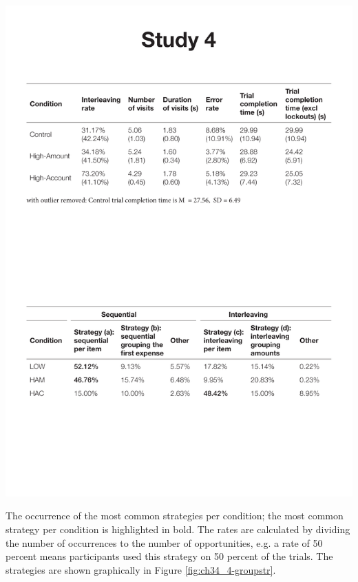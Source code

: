 \begin{table}[!ht]
  \centering
    \includegraphics[width=\textwidth]{images/ch34/ch4_4-StrategyFreq.pdf}
\caption{The occurrence of the most common strategies per condition; the most common strategy per condition is highlighted in bold. The rates are calculated by dividing the number of occurrences to the number of opportunities, e.g. a  rate of 50 percent means participants used this strategy on 50 percent of the trials. The strategies are shown graphically in Figure \ref{fig:ch34_4-groupstr}.}
          \label{tbl:ch34_4-groupstr}
\end{table}


